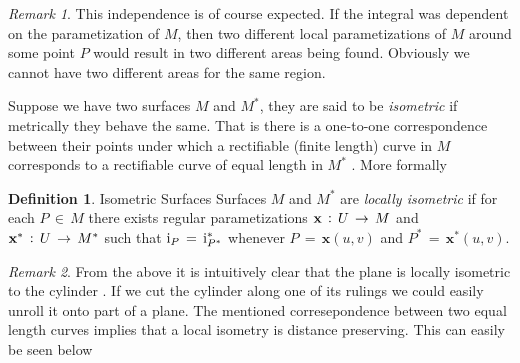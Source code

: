 \documentclass{UKZNcomp}
\newcommand{\vect}[1]{\mathbf{#1}} %
\newcommand{\RN}[1]{%
  \textup{\uppercase\expandafter{\romannumeral#1}}%
}
\theoremstyle{definition}
\newtheorem{definition}{Definition}[section]
\theoremstyle{remark}
\newtheorem*{remark}{Remark}
\begin{document}
\begin{remark}
This independence is of course expected. If the integral was dependent on the parametization of $M$, then two different local parametizations of $M$ around some point $P$ would result in two different areas being found. Obviously we cannot have two different areas for the same region.
\end{remark}

Suppose we have two surfaces $M$ and $M^*$, they are said to be \textit{isometric} if metrically they behave the same. That is there is a one-to-one correspondence between their points under which a rectifiable (finite length) curve in $M$ corresponds to a rectifiable curve of equal length in $M^*$ \cite{DC1976}. More formally

\begin{definition}{Isometric Surfaces}
Surfaces $M$ and $M^*$ are \textit{locally isometric} if for each $P\,\in\,M$ there exists regular parametizations $\vect{x}\,\vcentcolon\,U\,\to\,M$ and $\vect{x}^*\,\vcentcolon\,U\,\to\,M^*$ such that $\RN{1}_P\,=\,\RN{1}^*_{P^*}$ whenever $P\,=\,\vect{x}(u,v)$ and $P^*\,=\,\vect{x}^*(u,v)$.
\end{definition}

\begin{remark}
From the above it is intuitively clear that the plane is locally isometric to the cylinder \cite{Shifrin2016}. If we cut the cylinder along one of its rulings we could easily unroll it onto part of a plane. The mentioned corresepondence between two equal length curves implies that a local isometry is distance preserving. This can easily be seen below
\end{remark}
\end{document}
